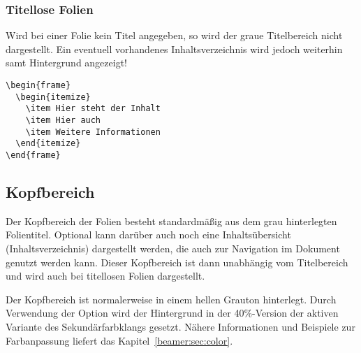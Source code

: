 \subsubsection{Titellose Folien}

Wird bei einer Folie kein Titel angegeben, so wird der graue Titelbereich
nicht dargestellt.
Ein eventuell vorhandenes Inhaltsverzeichnis wird jedoch weiterhin samt
Hintergrund angezeigt!

\begin{minipage}{0.5\textwidth}
\begin{verbatim}
\begin{frame}
  \begin{itemize}
    \item Hier steht der Inhalt
    \item Hier auch
    \item Weitere Informationen
  \end{itemize}
\end{frame}
\end{verbatim}
\end{minipage}
\begin{minipage}{0.5\textwidth}
\end{minipage}

\subsection{Kopfbereich}\label{subsec:head}

Der Kopfbereich der Folien besteht standardmäßig aus dem grau hinterlegten
Folientitel. Optional kann darüber auch noch eine Inhaltsübersicht
(Inhaltsverzeichnis) dargestellt werden, 
die auch zur Navigation im Dokument genutzt werden kann.
Dieser Kopfbereich ist dann unabhängig vom Titelbereich und wird
auch bei titellosen Folien dargestellt.

\begin{Declaration}
\end{Declaration}

Der Kopfbereich ist normalerweise in einem hellen Grauton hinterlegt.
Durch Verwendung der Option  wird der Hintergrund
in der 40\%-Version der aktiven Variante des Sekundärfarbklangs gesetzt.
Nähere Informationen und Beispiele zur Farbanpassung liefert das
Kapitel~\ref{beamer:sec:color}.

